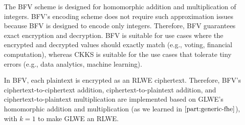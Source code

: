 The BFV scheme is designed for homomorphic addition and multiplication of integers. BFV's encoding scheme does not require such approximation issues because BFV is designed to encode only integers. Therefore, BFV guarantees exact encryption and decryption. BFV is suitable for use cases where the encrypted and decrypted values should exactly match (e.g., voting, financial computation), whereas CKKS is suitable for the use cases that tolerate tiny errors (e.g., data analytics, machine learning).  

In BFV, each plaintext is encrypted as an RLWE ciphertext. Therefore, BFV's ciphertext-to-ciphertext addition, ciphertext-to-plaintext addition, and ciphertext-to-plaintext multiplication are implemented based on GLWE's homomorphic addition and multiplication (as we learned in $\autoref{part:generic-fhe}$), with $k = 1$ to make GLWE an RLWE. 




